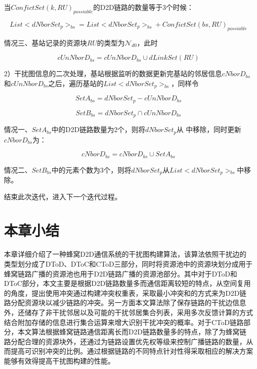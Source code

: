 \documentclass[figurelist,tablelist,algorithmlist,nomlist,masters]{seuthesix}
\begin{document}
	当$ConfictSet{(k,RU)_{possiable}}$的D2D链路的数量等于3个时候：
	
	\begin{equation}\label{eq2.25}
	List < dNborSet_{p}{ > _{bs}} = List < dNborSet_{p}{ > _{bs}} + ConfictSet{(bs,RU)_{possiable}}
	\end{equation}
	
	
	情况三、基站记录的资源块$RU$的类型为$\mathcal{N}_{d0}$，此时
	
	\begin{equation}\label{eq2.26}
	cUnNborD_{bs} = cUnNborD_{bs} \cup dLinkSet(RU)
	\end{equation}
	
	
	2）干扰图信息的二次处理，基站根据监听的数据更新完基站的邻居信息$cNborD_{bs}$和$cUnNborD_{bs}$之后，遍历基站的$List < dNborSet_{p}{ > _{bs}}$，同样令
	
	\begin{equation}\label{eq2.27}
	Set{A_{bs}} = dNborSet_{p} - cUnNborD_{bs}
	\end{equation}
	
	\begin{equation}\label{eq2.28}
	Set{B_{bs}} = dNborSet_{p} \cap cUnNborD_{bs}
	\end{equation}
	
	情况一、$Set{A_{bs}}$中的D2D链路数量为2个，则将$dNborSet_{p}$从 中移除，同时更新$cNborD_{bs}$为：
	
	\begin{equation}\label{eq2.29}
	cNborD_{bs} = cNborD_{bs} \cup Set{A_{bs}}
	\end{equation}
	
	情况二、$Set{B_{bs}}$中的元素个数为3个，则将$dNborSet_{p}$从$List < dNborSet_{p}{ > _{bs}}$中移除。
	
	结束此次迭代，进入下一个迭代过程。
	
	\section{本章小结}
	
	本章详细介绍了一种蜂窝D2D通信系统的干扰图构建算法，该算法依照干扰边的类型划分成了DToD、DToC和CToD三部分，同时将资源池中的资源块划分成用于蜂窝链路广播的资源池也用于D2D链路广播的资源池部分。其中对于DToD和DToC部分，本文主要是根据D2D链路数量多而通信距离较短的特点，从空间复用的角度，提出使用冲突通过构建冲突权重表，采取最小冲突和的方式来为D2D链路分配资源块以减少链路的冲突。另一方面本文算法除了保存链路的干扰边信息外，还储存了非干扰邻居以及可能的干扰邻居集合列表，采用多次反馈计算的方式结合附加存储的信息进行集合运算来增大识别干扰冲突的概率。对于CToD链路部分，本文算法根据蜂窝链路通信距离长而D2D链路数量多的特点，除了为蜂窝链路分配合理的资源块外，还通过为链路设置优先权等级来控制广播链路的数量，从而提高可识别冲突的比例。通过根据链路的不同特点针对性得采取相应的解决方案能够有效得提高干扰图构建的性能。
	
\end{document}
